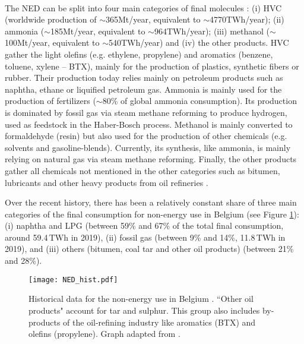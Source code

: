 \\

\noindent
The \gls{NED} can be split into four main categories of final molecules \cite{IEA2018_petrochemicals}: (i) \gls{HVC} (worldwide production of $\sim$365Mt/year, equivalent to $\sim$4770TWh/year); (ii) ammonia ($\sim$185Mt/year, equivalent to $\sim$964TWh/year); (iii) methanol ($\sim$100Mt/year, equivalent to $\sim$540TWh/year) and (iv) the other products. \Gls{HVC} gather the light olefins (e.g. ethylene, propylene) and aromatics (benzene, toluene, xylene – BTX), mainly for the production of plastics, synthetic fibers or rubber. Their production today relies mainly on petroleum products such as naphtha, ethane or liquified petroleum gas. Ammonia is  mainly used for the production of fertilizers ($\sim$80\% of global ammonia consumption). Its production is dominated by fossil gas via steam methane reforming to produce hydrogen, used as feedstock in the Haber-Bosch process. Methanol is mainly converted to formaldehyde (resin) but also used for the production of other chemicals (e.g. solvents and gasoline-blends). Currently, its synthesis, like ammonia, is mainly relying on natural gas via steam methane reforming. Finally, the other products gather all chemicals not mentioned in the other categories such as bitumen, lubricants and other heavy products from oil refineries \cite{daioglou2014energy}.

Over the recent history, there has been a relatively constant share of three main categories of the final consumption for non-energy use in Belgium \cite{statbel_NED_2019} (see Figure \ref{fig:cs_NED_hist}): (i) naphtha and \gls{LPG} (between 59\% and 67\% of the total final consumption, around 59.4\,TWh in 2019), (ii) fossil gas (between 9\% and 14\%, 11.8\,TWh in 2019), and (iii) others (\ie bitumen, coal tar and other oil products) (between 21\% and 28\%). 

\begin{figure}[htbp!]
\centering
\texttt{[image: NED\_hist.pdf]}
\caption{Historical data for the non-energy use in Belgium \cite{statbel_NED_2019}. ``Other oil products" account for tar and sulphur. This group also includes by-products of the oil-refining industry like aromatics (\eg \acrfull{BTX}) and olefins (\eg propylene). Graph adapted from \cite{rixhon2021comprehensive}.}
\label{fig:cs_NED_hist}
\end{figure}

